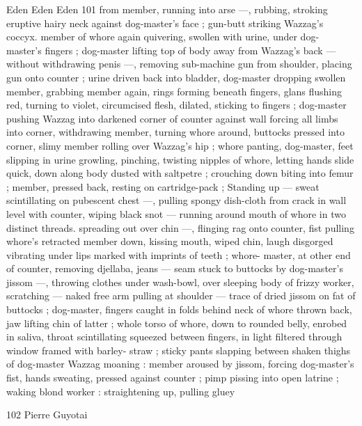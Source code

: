 Eden Eden Eden 101
from member, running into arse —, rubbing, stroking eruptive hairy
neck against dog-master's face ; gun-butt striking Wazzag's coccyx.
member of whore again quivering, swollen with urine, under dog-
master's fingers ; dog-master lifting top of body away from Wazzag's
back — without withdrawing penis —, removing sub-machine gun
from shoulder, placing gun onto counter ; urine driven back into
bladder, dog-master dropping swollen member, grabbing member
again, rings forming beneath fingers, glans flushing red, turning to
violet, circumcised flesh, dilated, sticking to fingers ; dog-master
pushing Wazzag into darkened corner of counter against wall
forcing all limbs into corner, withdrawing member, turning whore
around, buttocks pressed into corner, slimy member rolling over
Wazzag's hip ; whore panting, dog-master, feet slipping in urine
growling, pinching, twisting nipples of whore, letting hands slide
quick, down along body dusted with saltpetre ; crouching down
biting into femur ; member, pressed back, resting on cartridge-pack
; Standing up — sweat scintillating on pubescent chest —, pulling
spongy dish-cloth from crack in wall level with counter, wiping black
snot — running around mouth of whore in two distinct threads.
spreading out over chin —, flinging rag onto counter, fist pulling
whore's retracted member down, kissing mouth, wiped chin, laugh
disgorged vibrating under lips marked with imprints of teeth ; whore-
master, at other end of counter, removing djellaba, jeans — seam
stuck to buttocks by dog-master's jissom —, throwing clothes under
wash-bowl, over sleeping body of frizzy worker, scratching — naked
free arm pulling at shoulder — trace of dried jissom on fat of
buttocks ; dog-master, fingers caught in folds behind neck of whore
thrown back, jaw lifting chin of latter ; whole torso of whore, down to
rounded belly, enrobed in saliva, throat scintillating squeezed
between fingers, in light filtered through window framed with barley-
straw ; sticky pants slapping between shaken thighs of dog-master
Wazzag moaning : member aroused by jissom, forcing dog-master’s
fist, hands sweating, pressed against counter ; pimp pissing into
open latrine ; waking blond worker : straightening up, pulling gluey

102 Pierre Guyotai

